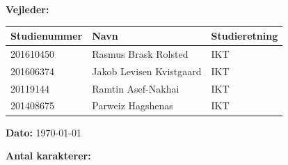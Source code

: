 \begin{center}
	\ifdefined\frontpageSupervisor
	\textbf{Vejleder:} \frontpageSupervisor\\
	\fi
	\vspace{5pt}
	\begin{tabular}{|l|l|l|}
		\hline
		\rowcolor{blue!25}
		\textbf{Studienummer} & \textbf{Navn} & \textbf{Studieretning} \\ [2pt]
		\hline
		201610450 & Rasmus Brask Rolsted & IKT \\
		\hline
		201606374 & Jakob Levisen Kvistgaard & IKT \\
		\hline
		20119144 & Ramtin Asef-Nakhai & IKT \\
		\hline
		201408675 & Parweiz Hagshenas & IKT \\
		\hline
	\end{tabular}

	{\fontsize{10pt}{0}\selectfont
		\textbf{Dato: } \today\\
	}
	\vspace{5pt}
	
	\ifdefined\frontpageCharacters
		\textbf{Antal karakterer: } \frontpageCharacters\\
	\fi
	\vspace{30pt}

\end{center}
